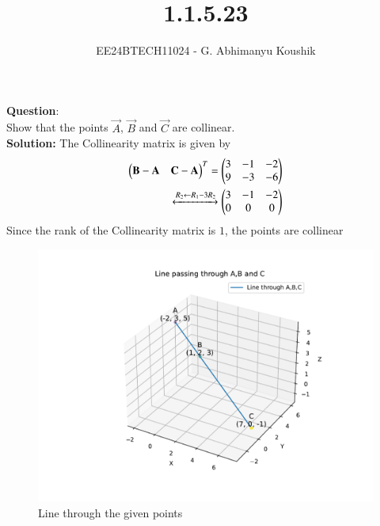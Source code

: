 \documentclass[journal]{IEEEtran}
\begin{document}

\vspace{3cm}

\title{1.1.5.23}
\author{EE24BTECH11024 - G. Abhimanyu Koushik
}
{\let\newpage\relax\maketitle}

\renewcommand{\thefigure}{\theenumi}
\renewcommand{\thetable}{\theenumi}
\setlength{\intextsep}{10pt} %


\renewcommand{\thetable}{\theenumi}


\textbf{Question}:\\
Show that the points $\vec{A}$, $\vec{B}$ and $\vec{C}$ are collinear.
\\
\textbf{Solution: }
The Collinearity matrix is given by\\
\begin{align}
\begin{pmatrix}
   \mathbf{B}-\mathbf{A} & \mathbf{C}-\mathbf{A}
 \end{pmatrix}^T = \begin{pmatrix}
   3 & -1 & -2
   \\
   9 & -3 & -6
   \end{pmatrix}\\
 \xleftrightarrow[]{R_2 \leftarrow {R_1-3R_2}}
 \begin{pmatrix}
   3 & -1 & -2
   \\
   0 & 0 & 0
   \end{pmatrix}
\end{align}
Since the rank of the Collinearity matrix is $1$, the points are collinear
\begin{figure}[h!]
   \centering
   \includegraphics[width=0.7\linewidth]{figs/fig.pdf}
   \caption{Line through the given points}
   \label{stemplot}
\end{figure}
\end{document}
